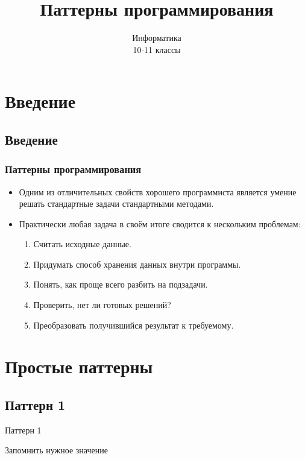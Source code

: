 \documentclass[compress,red]{beamer}
\title{Паттерны программирования}
\author{Информатика \\ 10-11 классы}
\begin{document}
\maketitle

\section{Введение}
\subsection{Введение}
\begin{frame}[fragile]
\frametitle{Паттерны программирования}
		\begin{itemize}
		\item Одним из отличительных свойств хорошего программиста является умение решать стандартные задачи стандартными методами.
		\item Практически любая задача в своём итоге сводится к нескольким проблемам:
		  \begin{enumerate}
				\item Считать исходные данные.
				\item Придумать способ хранения данных внутри программы.
				\item Понять, как проще всего разбить на подзадачи.
				\item Проверить, нет ли готовых решений?
				\item Преобразовать получившийся результат к требуемому.
		  \end{enumerate}
		\end{itemize}
\end{frame}

\section{Простые паттерны}
\subsection{Паттерн 1}
\begin{frame}
	\begin{center}
		\Huge{Паттерн 1}
	\end{center}
	\begin{center}
		\Large{Запомнить нужное значение}
	\end{center}
\end{frame}
\end{document}
